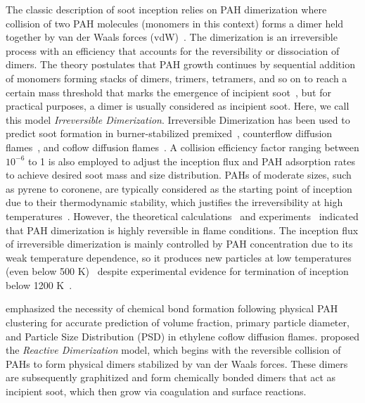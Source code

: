 The classic description of soot inception relies on PAH dimerization where collision of two PAH molecules (monomers in this context) forms a dimer held together by van der Waals forces (vdW)~\citep{frenklach1991detailed}. The dimerization is an irreversible process with an efficiency that accounts for the reversibility or dissociation of dimers. The theory postulates that PAH growth continues by sequential addition of monomers forming stacks of dimers, trimers, tetramers, and so on to reach a certain mass threshold that marks the emergence of incipient soot~\citep{frenklach1991detailed}, but for practical purposes, a dimer is usually considered as incipient soot. Here, we call this model \textit{Irreversible Dimerization}. 
Irreversible Dimerization has been used to predict soot formation in burner-stabilized premixed~\citep{salenbauch2015modeling, desgroux2017comparative}, counterflow diffusion flames~\citep{wang2015soot, xu2021experimental}, and coflow diffusion flames~\citep{kholghy2016core, veshkini2016understanding}. A collision efficiency factor ranging between $10^{-6}$ to 1 is also employed to adjust the inception flux and PAH adsorption rates to achieve desired soot mass and size distribution. PAHs of moderate sizes, such as pyrene to coronene, are typically considered as the starting point of inception due to their thermodynamic stability, which justifies the irreversibility at high temperatures~\citep{frenklach1991detailed}. However, the theoretical calculations~\citep{miller1985calculations} and experiments~\citep{sabbah2010exploring} indicated that PAH dimerization is highly reversible in flame conditions. The inception flux of irreversible dimerization is mainly controlled by PAH concentration due to its weak temperature dependence, so it produces new particles at low temperatures (even below 500 K)~\citep{naseri2022simulating} despite experimental evidence for termination of inception below 1200 K~\citep{sanchez2012polycyclic, cho2016synthesis}. 



\citet{kholghy2019role} emphasized the necessity of chemical bond formation following physical PAH clustering for accurate prediction of volume fraction, primary particle diameter, and Particle Size Distribution (PSD) in ethylene coflow diffusion flames. \citet{kholghy2018reactive} proposed the \textit{Reactive Dimerization} model, which begins with the reversible collision of PAHs to form physical dimers stabilized by van der Waals forces. These dimers are subsequently graphitized and form chemically bonded dimers that act as incipient soot, which then grow via coagulation and surface reactions.

